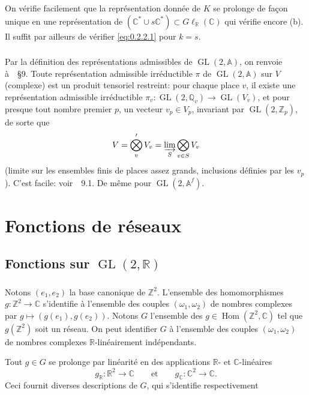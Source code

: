 \documentclass[11pt,a4paper]{amsart}
\theoremstyle{plain}
\theoremstyle{definition}
\theoremstyle{remark}
\DeclareMathOperator{\Hom}{Hom}
\DeclareMathOperator{\GL}{GL}
\newcommand{\ZZ}{\mathbb{Z}}
\newcommand{\QQ}{\mathbb{Q}}
\newcommand{\RR}{\mathbb{R}}
\newcommand{\CC}{\mathbb{C}}
\newcommand{\Af}{\mathbb{A}}
\begin{document}
On v\'erifie facilement que la repr\'esentation donn\'ee de $K$ se prolonge de fa\c{c}on unique en une repr\'esentation de $(\CC^* \cup s\CC^*) \subset G\ell_{\RR}(\CC)$ qui v\'erifie encore (b). Il suffit par ailleurs de v\'erifier \eqref{eq:0.2.2.1} pour $k = s$.

\subsubsection{}
\label{sec:0.2.3}

Par la d\'efinition des repr\'esentations admissibles de $\GL(2,\Af)$, on renvoie \`a~\cite{JL}~\S 9. Toute repr\'esentation admissible irr\'eductible $\pi$ de $\GL(2,\Af)$ sur $V$ (complexe) est un produit tensoriel restreint: pour chaque place $v$, il existe une repr\'esentation admissible irr\'eductible $\pi_v: \GL(2,\QQ_v) \to \GL(V_v)$, et pour presque tout nombre premier $p$, un vecteur $v_p \in V_p$, invariant par $\GL(2,\ZZ_p)$, de sorte que
\[ V = \bigotimes'_v V_v = \varinjlim_{S} \bigotimes_{v \in S} V_v \]
(limite sur les ensembles finis de places assez grands, inclusions d\'efinies par les $v_p$). C'est facile: voir~\cite{JL}~9.1. De m\^eme pour $\GL(2,\Af^f)$.

\section{Fonctions de r\'eseaux}

\subsection{Fonctions sur $\GL(2,\RR)$}

\subsubsection{}
\label{sec:1.1.1}

Notons $(e_1, e_2)$ la base canonique de $\ZZ^2$. L'ensemble des homomorphismes $g: \ZZ^2 \to \CC$ s'identifie \`a l'ensemble des couples $(\omega_1, \omega_2)$ de nombres complexes par $g \mapsto (g(e_1), g(e_2))$. Notons $G$ l'ensemble des $g \in \Hom(\ZZ^2, \CC)$ tel que $g(\ZZ^2)$ soit un r\'eseau. On peut identifier $G$ \`a l'ensemble des couples $(\omega_1, \omega_2)$ de nombres complexes $\RR$-lin\'eairement ind\'ependants.

Tout $g \in G$ se prolonge par lin\'earit\'e en des applications $\RR$- et $\CC$-lin\'eaires
\[ g_{\RR}: \RR^2 \longrightarrow \CC \qquad \text{et} \qquad g_{\CC}: \CC^2 \longrightarrow \CC. \]
Ceci fournit diverses descriptions de $G$, qui s'identifie respectivement
\end{document}
